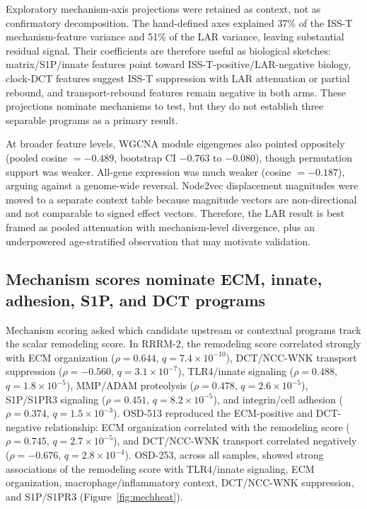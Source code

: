 \documentclass[11pt]{article}
\begin{document}
Exploratory mechanism-axis projections were retained as context, not as confirmatory decomposition. The hand-defined axes explained 37\% of the ISS-T mechanism-feature variance and 51\% of the LAR variance, leaving substantial residual signal. Their coefficients are therefore useful as biological sketches: matrix/S1P/innate features point toward ISS-T-positive/LAR-negative biology, clock-DCT features suggest ISS-T suppression with LAR attenuation or partial rebound, and transport-rebound features remain negative in both arms. These projections nominate mechanisms to test, but they do not establish three separable programs as a primary result.

At broader feature levels, WGCNA module eigengenes also pointed oppositely (pooled cosine $=-0.489$, bootstrap CI $-0.763$ to $-0.080$), though permutation support was weaker. All-gene expression was much weaker (cosine $=-0.187$), arguing against a genome-wide reversal. Node2vec displacement magnitudes were moved to a separate context table because magnitude vectors are non-directional and not comparable to signed effect vectors. Therefore, the LAR result is best framed as pooled attenuation with mechanism-level divergence, plus an underpowered age-stratified observation that may motivate validation.

\subsection{Mechanism scores nominate ECM, innate, adhesion, S1P, and DCT programs}

Mechanism scoring asked which candidate upstream or contextual programs track the scalar remodeling score. In RRRM-2, the remodeling score correlated strongly with ECM organization ($\rho=0.644$, $q=7.4\times10^{-10}$), DCT/NCC-WNK transport suppression ($\rho=-0.560$, $q=3.1\times10^{-7}$), TLR4/innate signaling ($\rho=0.488$, $q=1.8\times10^{-5}$), MMP/ADAM proteolysis ($\rho=0.478$, $q=2.6\times10^{-5}$), S1P/S1PR3 signaling ($\rho=0.451$, $q=8.2\times10^{-5}$), and integrin/cell adhesion ($\rho=0.374$, $q=1.5\times10^{-3}$). OSD-513 reproduced the ECM-positive and DCT-negative relationship: ECM organization correlated with the remodeling score ($\rho=0.745$, $q=2.7\times10^{-5}$), and DCT/NCC-WNK transport correlated negatively ($\rho=-0.676$, $q=2.8\times10^{-4}$). OSD-253, across all samples, showed strong associations of the remodeling score with TLR4/innate signaling, ECM organization, macrophage/inflammatory context, DCT/NCC-WNK suppression, and S1P/S1PR3 (Figure~\ref{fig:mechheat}).
\end{document}
